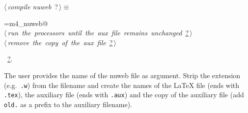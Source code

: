 \documentclass[twoside]{artikel3}
\renewcommand{\NWlink}[2]{\hyperlink{#1}{#2}}
\renewcommand{\NWtarget}[2]{\hypertarget{#1}{#2}}
\renewcommand{\NWsep}{$\diamond$\rule[-1\baselineskip]{0pt}{1\baselineskip}}
\renewcommand{\NWlink}[2]{\hyperlink{#1}{#2}}
\renewcommand{\NWtarget}[2]{\hypertarget{#1}{#2}}
\begin{document}
\begin{flushleft} \small
\begin{minipage}{\linewidth}\label{scrap23}\raggedright\small
\NWtarget{nuweb?}{} $\langle\,${\itshape compile nuweb}\nobreak\ {\footnotesize {?}}$\,\rangle\equiv$
\vspace{-1ex}
\begin{list}{}{} \item
\mbox{}\verb@NUWEB=m4_nuweb@\\
\mbox{}\verb@@\hbox{$\langle\,${\itshape run the processors until the aux file remains unchanged}\nobreak\ {\footnotesize \NWlink{nuweb?}{?}}$\,\rangle$}\verb@@\\
\mbox{}\verb@@\hbox{$\langle\,${\itshape remove the copy of the aux file}\nobreak\ {\footnotesize \NWlink{nuweb?}{?}}$\,\rangle$}\verb@@\\
\mbox{}\verb@@{\NWsep}
\end{list}
\vspace{-1.5ex}
\footnotesize
\begin{list}{}{\setlength{\itemsep}{-\parsep}\setlength{\itemindent}{-\leftmargin}}
\item \NWtxtMacroRefIn\ \NWlink{nuweb?}{?}.

\item{}
\end{list}
\end{minipage}\vspace{4ex}
\end{flushleft}
The user provides the name of the nuweb file as argument. Strip the
extension (e.g.\ \verb|.w|) from the filename and create the names of
the \LaTeX{} file (ends with \verb|.tex|), the auxiliary file (ends
with \verb|.aux|) and the copy of the auxiliary file (add \verb|old.|
as a prefix to the auxiliary filename).
\end{document}
